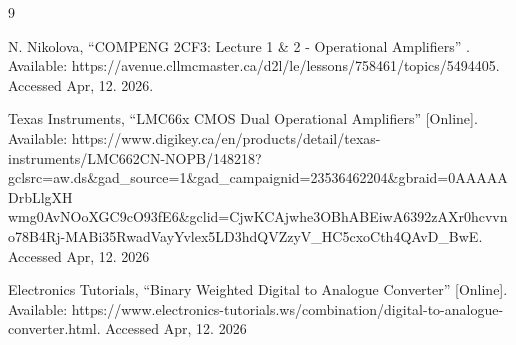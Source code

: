 \documentclass[12pt]{article}
\begin{document}
    \newpage
    \begin{thebibliography}{9}

        N. Nikolova, ``COMPENG 2CF3: Lecture 1 \& 2 - Operational Amplifiers'' 
        . Available: https://avenue.cllmcmaster.ca/d2l/le/lessons/758461/topics/5494405. Accessed Apr, 12. 2026.

        Texas Instruments, ``LMC66x CMOS Dual Operational Amplifiers'' 
        [Online]. Available: https://www.digikey.ca/en/products/detail/texas-instruments/LMC662CN-NOPB/148218?gclsrc=aw.ds\&gad\_source=1\&gad\_campaignid=23536462204\&gbraid=0AAAAADrbLlgXH \\ wmg0AvNOoXGC9cO93fE6\&gclid=CjwKCAjwhe3OBhABEiwA6392zAXr0hcvvno78B4Rj-MABi35RwadVayYvlex5LD3hdQVZzyV\_HC5cxoCth4QAvD\_BwE. Accessed Apr, 12. 2026

    Electronics Tutorials, ``Binary Weighted Digital to Analogue Converter'' 
    [Online]. Available: https://www.electronics-tutorials.ws/combination/digital-to-analogue-converter.html. Accessed Apr, 12. 2026

    \end{thebibliography} 
\end{document}
